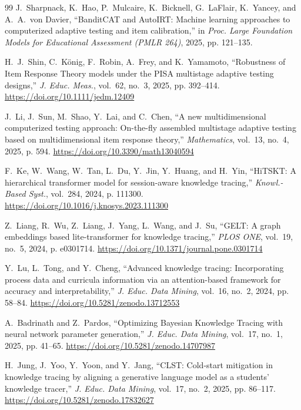 \documentclass[conference]{IEEEtran}
\begin{document}
\begin{thebibliography}{99}
J.~Sharpnack, K.~Hao, P.~Mulcaire, K.~Bicknell, G.~LaFlair, K.~Yancey, and A.~A.~von Davier, ``BanditCAT and AutoIRT: Machine learning approaches to computerized adaptive testing and item calibration,'' in \emph{Proc. Large Foundation Models for Educational Assessment (PMLR 264)}, 2025, pp. 121--135.

H.~J.~Shin, C.~König, F.~Robin, A.~Frey, and K.~Yamamoto, ``Robustness of Item Response Theory models under the PISA multistage adaptive testing designs,'' \emph{J. Educ. Meas.}, vol.~62, no.~3, 2025, pp. 392--414. \url{https://doi.org/10.1111/jedm.12409}

J.~Li, J.~Sun, M.~Shao, Y.~Lai, and C.~Chen, ``A new multidimensional computerized testing approach: On-the-fly assembled multistage adaptive testing based on multidimensional item response theory,'' \emph{Mathematics}, vol.~13, no.~4, 2025, p. 594. \url{https://doi.org/10.3390/math13040594}

F.~Ke, W.~Wang, W.~Tan, L.~Du, Y.~Jin, Y.~Huang, and H.~Yin, ``HiTSKT: A hierarchical transformer model for session-aware knowledge tracing,'' \emph{Knowl.-Based Syst.}, vol.~284, 2024, p. 111300. \url{https://doi.org/10.1016/j.knosys.2023.111300}

Z.~Liang, R.~Wu, Z.~Liang, J.~Yang, L.~Wang, and J.~Su, ``GELT: A graph embeddings based lite-transformer for knowledge tracing,'' \emph{PLOS ONE}, vol.~19, no.~5, 2024, p. e0301714. \url{https://doi.org/10.1371/journal.pone.0301714}

Y.~Lu, L.~Tong, and Y.~Cheng, ``Advanced knowledge tracing: Incorporating process data and curricula information via an attention-based framework for accuracy and interpretability,'' \emph{J. Educ. Data Mining}, vol.~16, no.~2, 2024, pp. 58--84. \url{https://doi.org/10.5281/zenodo.13712553}

A.~Badrinath and Z.~Pardos, ``Optimizing Bayesian Knowledge Tracing with neural network parameter generation,'' \emph{J. Educ. Data Mining}, vol.~17, no.~1, 2025, pp. 41--65. \url{https://doi.org/10.5281/zenodo.14707987}

H.~Jung, J.~Yoo, Y.~Yoon, and Y.~Jang, ``CLST: Cold-start mitigation in knowledge tracing by aligning a generative language model as a students' knowledge tracer,'' \emph{J. Educ. Data Mining}, vol.~17, no.~2, 2025, pp. 86--117. \url{https://doi.org/10.5281/zenodo.17832627}


\end{thebibliography}
\end{document}
